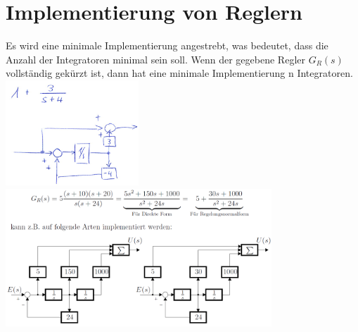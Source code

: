 \section{Implementierung von Reglern}
\begin{multicols}{2}
Es wird eine minimale Implementierung angestrebt, was bedeutet, dass die Anzahl
der Integratoren minimal sein soll. Wenn der gegebene Regler $G_R(s)$ vollständig
gekürzt ist, dann hat eine minimale Implementierung n Integratoren.
\includegraphics[width=5cm]{./images/implementierung2.png}
\includegraphics[width=10cm]{./images/implementierung.png}
\end{multicols}
